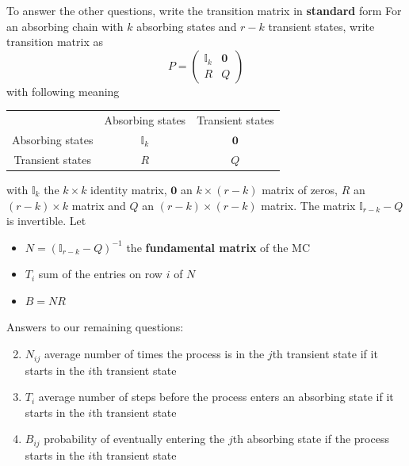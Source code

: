 \documentclass[aspectratio=43]{beamer}
\begin{document}
\begin{frame}
To answer the other questions, write the transition matrix in \textbf{standard} form
\vfill
For an absorbing chain with $k$ absorbing states and $r-k$ transient states, write transition matrix as
\[
P=\begin{pmatrix}
\mathbb{I}_k & \mathbf{0} \\
R & Q
\end{pmatrix}
\]
with following meaning
\begin{center}\footnotesize
\begin{tabular}{ccc}
& Absorbing states & Transient states \\
Absorbing states & $\mathbb{I}_k$ & $\mathbf{0}$ \\
Transient states & $R$ & $Q$
\end{tabular}
\end{center}
with $\mathbb{I}_k$ the $k\times k$ identity matrix, $\mathbf{0}$ an $k\times(r-k)$ matrix of zeros, $R$ an $(r-k)\times k$ matrix and $Q$ an $(r-k)\times(r-k)$ matrix.
The matrix $\mathbb{I}_{r-k}-Q$ is invertible. Let
\begin{itemize}
\item $N=(\mathbb{I}_{r-k}-Q)^{-1}$ the \textbf{fundamental matrix} of the MC
\item $T_i$ sum of the entries on row $i$ of $N$
\item $B=NR$
\end{itemize}
\end{frame}

\begin{frame}
Answers to our remaining questions:
\vfill
\begin{enumerate}
\setcounter{enumi}{1}
\item $N_{ij}$ average number of times the process is in the $j$th transient state if it starts in the $i$th transient state
\vfill
\item $T_i$ average number of steps before the process enters an absorbing state if it starts in the $i$th transient state
\vfill
\item $B_{ij}$ probability of eventually entering the $j$th absorbing state if the process starts in the $i$th transient state
\end{enumerate}
\vfill
\end{frame}
\end{document}
